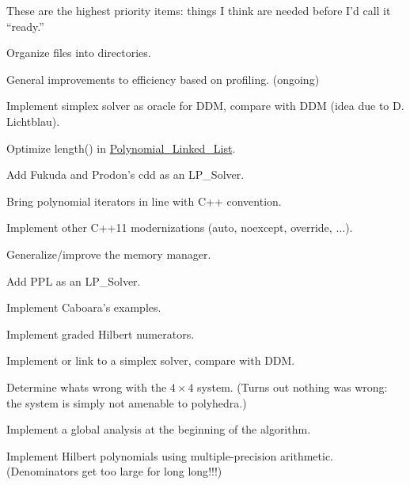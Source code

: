 
\begin{DoxyRefList}
\item[\label{todo__todo000001}%
\Hypertarget{todo__todo000001}%
page \hyperlink{index}{Dyn\+GB\+: Dynamic Gr\"{o}bner basis project files} ]These are the highest priority items\+: things I think are needed before I'd call it ``ready.''
\begin{DoxyItemize}
\item Organize files into directories.
\item General improvements to efficiency based on profiling. (ongoing)
\item Implement simplex solver as oracle for D\+DM, compare with D\+DM (idea due to D. Lichtblau).
\item Optimize length() in \hyperlink{group__polygroup_class_polynomial___linked___list}{Polynomial\+\_\+\+Linked\+\_\+\+List}.
\item Add Fukuda and Prodon's cdd as an L\+P\+\_\+\+Solver. \cite{Fukuda_DoubleDescriptionRevisited}
\item Bring polynomial iterators in line with C++ convention.
\item Implement other C++11 modernizations ({\ttfamily auto}, {\ttfamily noexcept}, {\ttfamily override}, {$\dots$}).
\item Generalize/improve the memory manager.
\item Add P\+PL as an L\+P\+\_\+\+Solver. \cite{BagnaraHZ08SCP}
\item Implement Caboara's examples.
\item Implement graded Hilbert numerators.
\item Implement or link to a simplex solver, compare with D\+DM.
\item Determine what\textquotesingle{}s wrong with the $4\times4$ system. (Turns out nothing was wrong\+: the system is simply not amenable to polyhedra.)
\item Implement a global analysis at the beginning of the algorithm.
\item Implement Hilbert polynomials using multiple-\/precision arithmetic. (Denominators get too large for {\ttfamily long long}!!!)
\end{DoxyItemize}


\end{DoxyRefList}
